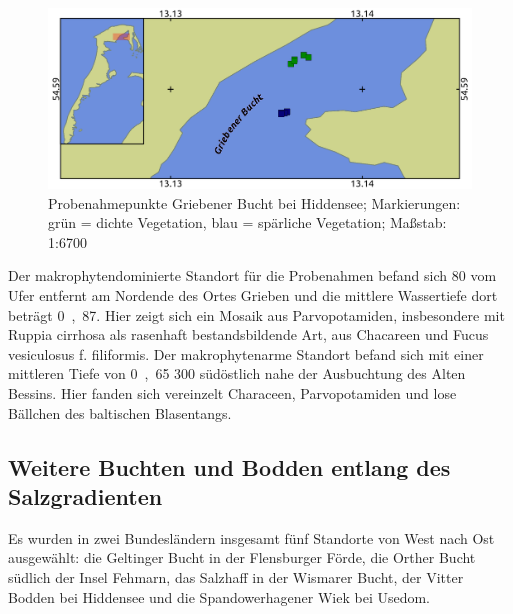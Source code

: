 \begin{figure}[htb]
\centering
\includegraphics[width=1\textwidth]{images/Grieben.png}
\caption[Probenahmepunkte Griebener Bucht]{Probenahmepunkte Griebener Bucht bei Hiddensee; Markierungen: grün = dichte Vegetation, blau = spärliche Vegetation; Maßstab: 1:6700}
\label{Grieben}
\end{figure}


Der makrophytendominierte Standort für die Probenahmen befand sich \unit{80}{\metre} vom Ufer entfernt am Nordende des Ortes Grieben und die mittlere Wassertiefe dort beträgt \unit{0,87}{\metre}. Hier zeigt sich ein Mosaik aus Parvopotamiden, insbesondere mit Ruppia cirrhosa als rasenhaft bestandsbildende Art, aus Chacareen und Fucus vesiculosus f. filiformis. Der makrophytenarme Standort befand sich mit einer mittleren Tiefe von \unit{0,65}{\metre} \unit{300}{\metre} südöstlich nahe der Ausbuchtung des Alten Bessins. Hier fanden sich vereinzelt Characeen, Parvopotamiden und lose Bällchen des baltischen Blasentangs.



\subsection{Weitere Buchten und Bodden entlang des Salzgradienten}


Es wurden in zwei Bundesländern insgesamt fünf Standorte von West nach Ost ausgewählt: die Geltinger Bucht in der Flensburger Förde, die Orther Bucht südlich der Insel Fehmarn, das Salzhaff in der Wismarer Bucht, der Vitter Bodden bei Hiddensee und die Spandowerhagener Wiek bei Usedom.



